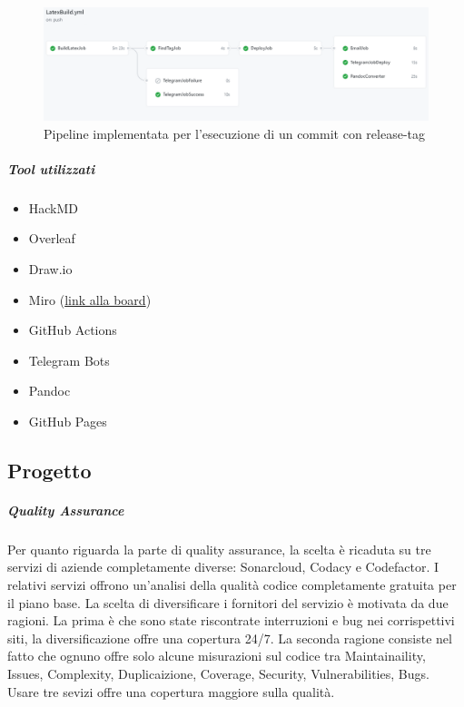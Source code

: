         \begin{figure}[H]
            \caption{Pipeline implementata per l'esecuzione di un commit con release-tag}
            \centering
            \includegraphics[width=1\textwidth]{Images/RepoCI.png}
        \end{figure}
        
        \subparagraph{Tool utilizzati}
        \begin{itemize}
            \item HackMD
            \item Overleaf
            \item Draw.io
            \item Miro (\href{https://miro.com/app/board/o9J_lEyTG7Q=/}{link alla board})
            \item GitHub Actions
            \item Telegram Bots
            \item Pandoc
            \item GitHub Pages
        \end{itemize}

    \subsection{Progetto}

        
        \subparagraph{Quality Assurance}
        Per quanto riguarda la parte di quality assurance, la scelta è ricaduta su tre servizi di aziende completamente diverse: Sonarcloud, Codacy e Codefactor. I relativi servizi offrono un'analisi della qualità codice completamente gratuita per il piano base. La scelta di diversificare i fornitori del servizio è motivata da due ragioni. La prima è che sono state riscontrate interruzioni e bug nei corrispettivi siti, la diversificazione offre una copertura 24/7. La seconda ragione consiste nel fatto che ognuno offre solo alcune misurazioni sul codice tra Maintainaility, Issues, Complexity, Duplicaizione, Coverage, Security, Vulnerabilities, Bugs. Usare tre sevizi offre una copertura maggiore sulla qualità.
